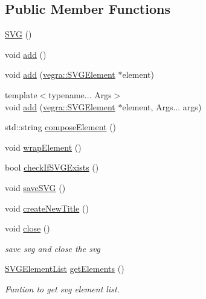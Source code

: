\subsection*{Public Member Functions}
\begin{DoxyCompactItemize}
\item 
\mbox{\hyperlink{structvegra_1_1SVG_a3fd44691284da36fbf659b230e870950}{S\+VG}} ()
\item 
void \mbox{\hyperlink{structvegra_1_1SVG_a018d3d664341f68deff0a170885bac05}{add}} ()
\item 
void \mbox{\hyperlink{structvegra_1_1SVG_a7d1da466cecd8260ae1e9514b15a2ec0}{add}} (\mbox{\hyperlink{structvegra_1_1SVGElement}{vegra\+::\+S\+V\+G\+Element}} $\ast$element)
\item 
{\footnotesize template$<$typename... Args$>$ }\\void \mbox{\hyperlink{structvegra_1_1SVG_a4c942cc22cecde5d82d796773aab772b}{add}} (\mbox{\hyperlink{structvegra_1_1SVGElement}{vegra\+::\+S\+V\+G\+Element}} $\ast$element, Args... args)
\item 
std\+::string \mbox{\hyperlink{structvegra_1_1SVG_aa24a923e5c6195e143623e141ada168b}{compose\+Element}} ()
\item 
void \mbox{\hyperlink{structvegra_1_1SVG_ae7192d00544cf372f5dfed2b2436c973}{wrap\+Element}} ()
\item 
bool \mbox{\hyperlink{structvegra_1_1SVG_a185b8b4ad59002b8fc921a288f69f9d9}{check\+If\+S\+V\+G\+Exists}} ()
\item 
void \mbox{\hyperlink{structvegra_1_1SVG_a739917fb674392c8a92ce56c609daf9c}{save\+S\+VG}} ()
\item 
void \mbox{\hyperlink{structvegra_1_1SVG_a02f78ba059b1ce0e659ee368fb6a782a}{create\+New\+Title}} ()
\item 
void \mbox{\hyperlink{structvegra_1_1SVG_a90d8788e7776685d3da401ce8a9a8596}{close}} ()
\begin{DoxyCompactList}\small\item\em save svg and close the svg \end{DoxyCompactList}\item 
\mbox{\hyperlink{namespacevegra_a2722f5eceb74f65746a02a57b71d125e}{S\+V\+G\+Element\+List}} \mbox{\hyperlink{structvegra_1_1SVG_a6096892ee39e3680fddd6657a98b7a75}{get\+Elements}} ()
\begin{DoxyCompactList}\small\item\em Funtion to get svg element list. \end{DoxyCompactList}\item 

\end{DoxyCompactItemize}
